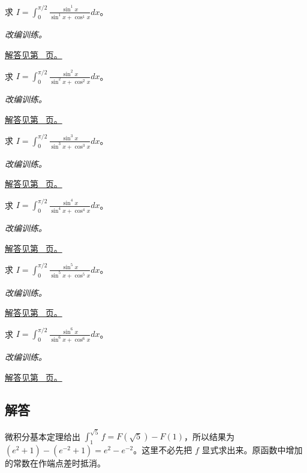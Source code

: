 \documentclass[12pt,fontset=fandol]{ctexart}
\begin{document}
\begin{example}[对称代换消去复杂分母]\label{ex:c17q21}
求 $I=\displaystyle\int_0^{\pi/2}\frac{\sin^{1}x}{\sin^{1}x+\cos^{1}x}dx$。
\par\textit{改编训练。}\par\hyperref[ans:c17q21]{解答见第~\pageref{ans:c17q21} 页。}
\end{example}
\begin{example}[对称代换消去复杂分母]\label{ex:c17q22}
求 $I=\displaystyle\int_0^{\pi/2}\frac{\sin^{2}x}{\sin^{2}x+\cos^{2}x}dx$。
\par\textit{改编训练。}\par\hyperref[ans:c17q22]{解答见第~\pageref{ans:c17q22} 页。}
\end{example}
\begin{example}[对称代换消去复杂分母]\label{ex:c17q23}
求 $I=\displaystyle\int_0^{\pi/2}\frac{\sin^{3}x}{\sin^{3}x+\cos^{3}x}dx$。
\par\textit{改编训练。}\par\hyperref[ans:c17q23]{解答见第~\pageref{ans:c17q23} 页。}
\end{example}
\begin{example}[对称代换消去复杂分母]\label{ex:c17q24}
求 $I=\displaystyle\int_0^{\pi/2}\frac{\sin^{4}x}{\sin^{4}x+\cos^{4}x}dx$。
\par\textit{改编训练。}\par\hyperref[ans:c17q24]{解答见第~\pageref{ans:c17q24} 页。}
\end{example}
\begin{example}[对称代换消去复杂分母]\label{ex:c17q25}
求 $I=\displaystyle\int_0^{\pi/2}\frac{\sin^{5}x}{\sin^{5}x+\cos^{5}x}dx$。
\par\textit{改编训练。}\par\hyperref[ans:c17q25]{解答见第~\pageref{ans:c17q25} 页。}
\end{example}
\begin{example}[对称代换消去复杂分母]\label{ex:c17q26}
求 $I=\displaystyle\int_0^{\pi/2}\frac{\sin^{6}x}{\sin^{6}x+\cos^{6}x}dx$。
\par\textit{改编训练。}\par\hyperref[ans:c17q26]{解答见第~\pageref{ans:c17q26} 页。}
\end{example}
\subsection{解答}
\begin{solve}\label{ans:c17q1}
微积分基本定理给出 $\int_1^{\sqrt5}f=F(\sqrt5)-F(1)$，所以结果为 $(e^2+1)-(e^{-2}+1)=e^2-e^{-2}$。这里不必先把 $f$ 显式求出来。原函数中增加的常数在作端点差时抵消。
\end{solve}
\end{document}
